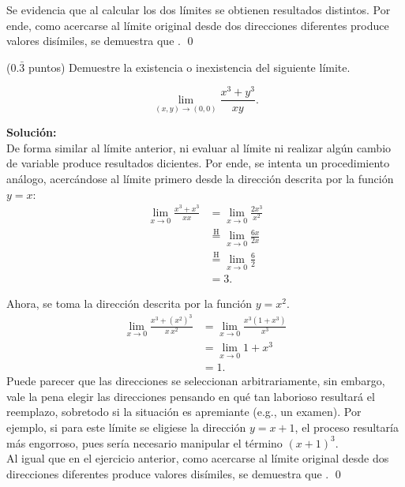 \documentclass{fmbvecto}
\begin{document}
\begin{problema}
Se evidencia que al calcular los dos límites se obtienen resultados distintos. Por ende, como acercarse al límite original desde dos direcciones diferentes produce valores disímiles, se demuestra que .
\qed

\end{problema}

\phantom{} %

\begin{problema}

(\(0.\bar{3}\) puntos) Demuestre la existencia o inexistencia del siguiente límite.

     \[\displaystyle  \lim_{(x, y) \to (0, 0)} \frac{x^3+y^3}{xy}.\]

\vspace{1em}
\tcblower
\textbf{Solución:}\\

De forma similar al límite anterior, ni evaluar al límite ni realizar algún cambio de variable produce resultados dicientes. Por ende, se intenta un procedimiento análogo, acercándose al límite primero desde la dirección descrita por la función \(y = x\):
\begin{align*}
    \lim_{x \to 0} \frac{x^3+x^3}{xx} &=  \lim_{x \to 0} \frac{2x^3}{x^2} \\ 
    & \stackrel{\text{H}}{=} \lim_{x \to 0} \frac{6x}{2x} \\ 
    & \stackrel{\text{H}}{=} \lim_{x \to 0} \frac{6}{2} \\ 
    & = 3.
\end{align*}

Ahora, se toma la dirección descrita por la función \(y = x^2\). 
\begin{align*}
    \lim_{x \to 0} \frac{x^3+(x^2)^3}{x \, x^2} &=  \lim_{x \to 0} \frac{x^3(1+x^3)}{x^3} \\ 
    & = \lim_{x \to 0} 1+x^3\\
    & = 1.
\end{align*}
Puede parecer que las direcciones se seleccionan arbitrariamente, sin embargo, vale la pena elegir las direcciones pensando en qué tan laborioso resultará el reemplazo, sobretodo si la situación es apremiante (e.g., un examen). Por ejemplo, si para este límite se eligiese la dirección \(y = x+1\), el proceso resultaría más engorroso, pues sería necesario manipular el término \((x+1)^3\).\\

Al igual que en el ejercicio anterior, como acercarse al límite original desde dos direcciones diferentes produce valores disímiles, se demuestra que .
\qed

\end{problema}
\end{document}
